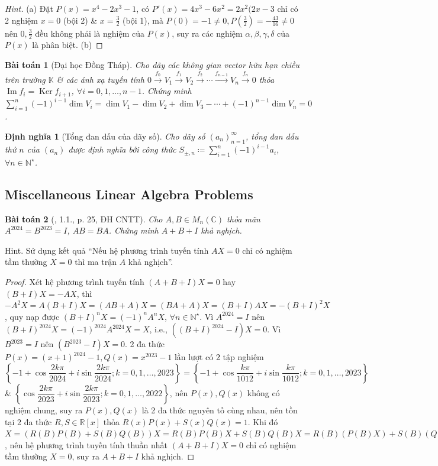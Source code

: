 \documentclass{article}
\newtheorem{baitoan}{Bài toán}
\newtheorem{dinhnghia}{Định nghĩa}
\begin{document}
\begin{proof}[Hint]
	(a) Đặt $P(x) = x^4 - 2x^3 - 1$, có $P'(x) = 4x^3 - 6x^2 = 2x^2(2x - 3$ chỉ có 2 nghiệm $x = 0$ (bội 2) \& $x = \frac{3}{2}$ (bội 1), mà $P(0) = -1\ne0,P(\frac{3}{2}) = -\frac{43}{16}\ne0$ nên $0,\frac{3}{2}$ đều không phải là nghiệm của $P(x)$, suy ra các nghiệm $\alpha,\beta,\gamma,\delta$ của $P(x)$ là phân biệt. (b) 
\end{proof}

\begin{baitoan}[Đại học Đồng Tháp]
	Cho dãy các không gian vector hữu hạn chiều trên trường $\mathbb{K}$ \& các ánh xạ tuyến tính $0\xrightarrow{f_0}V_1\xrightarrow{f_1}V_2\xrightarrow{f_2}\cdots\xrightarrow{f_{n-1}}V_n\xrightarrow{f_n}0$ thỏa $\operatorname{Im}f_i = \operatorname{Ker}f_{i+1}$, $\forall i = 0,1,\ldots,n-1$. Chứng minh $\sum_{i=1}^n (-1)^{i-1}\dim V_i = \dim V_1 - \dim V_2 + \dim V_3 - \cdots + (-1)^{n-1}\dim V_n = 0$.
\end{baitoan}

\begin{dinhnghia}[Tổng đan dấu của dãy số]
	Cho dãy số $(a_n)_{n=1}^\infty$, tổng đan dấu thứ $n$ của $(a_n)$ được định nghĩa bởi công thức $S_{\pm,n}\coloneqq\sum_{i=1}^n (-1)^{i-1}a_i$, $\forall n\in\mathbb{N}^\star$.
\end{dinhnghia}

\subsection{Miscellaneous Linear Algebra Problems}

\begin{baitoan}[\cite{VMS_VMC2024}, 1.1., p. 25, ĐH CNTT]
	Cho $A,B\in M_n(\mathbb{C})$ thỏa mãn $A^{2024} = B^{2023} = I$, $AB = BA$. Chứng minh $A + B + I$ khả nghịch.
\end{baitoan}
{\sf Hint.} Sử dụng kết quả ``Nếu hệ phương trình tuyến tính $AX = 0$ chỉ có nghiệm tầm thường $X = 0$ thì ma trận $A$ khả nghịch''.

\begin{proof}
	Xét hệ phương trình tuyến tính $(A + B + I)X = 0$ hay $(B + I)X = -AX$, thì $-A^2X = A(B + I)X = (AB + A)X = (BA + A)X = (B + I)AX = -(B + I)^2X$, quy nạp được $(B + I)^nX = (-1)^nA^nX$, $\forall n\in\mathbb{N}^\star$. Vì $A^{2024} = I$ nên $(B + I)^{2024}X = (-1)^{2024}A^{2024}X = X$, i.e., $((B + I)^{2024} - I)X = 0$. Vì $B^{2023} = I$ nên $(B^{2023} - I)X = 0$. 2 đa thức $P(x) = (x + 1)^{2024} - 1,Q(x) = x^{2023} - 1$ lần lượt có 2 tập nghiệm $\left\{-1 + \cos\dfrac{2k\pi}{2024} + i\sin\dfrac{2k\pi}{2024};k = 0,1,\ldots,2023\right\} = \left\{-1 + \cos\dfrac{k\pi}{1012} + i\sin\dfrac{k\pi}{1012};k = 0,1,\ldots,2023\right\}$ \& $\left\{\cos\dfrac{2k\pi}{2023} + i\sin\dfrac{2k\pi}{2023};k = 0,1,\ldots,2022\right\}$, nên $P(x),Q(x)$ không có nghiệm chung, suy ra $P(x),Q(x)$ là 2 đa thức nguyên tố cùng nhau, nên tồn tại 2 đa thức $R,S\in\mathbb{R}[x]$ thỏa $R(x)P(x) + S(x)Q(x) = 1$. Khi đó $X = (R(B)P(B) + S(B)Q(B))X = R(B)P(B)X + S(B)Q(B)X = R(B)(P(B)X) + S(B)(Q(B)X) = 0$, nên hệ phương trình tuyến tính thuần nhất $(A + B + I)X = 0$ chỉ có nghiệm tầm thường $X = 0$, suy ra $A + B + I$ khả nghịch.
\end{proof}
\end{document}
